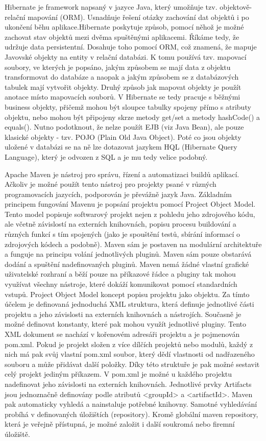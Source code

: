 Hibernate je framework napsaný v jazyce Java, který umožňuje tzv. objektově-relační mapování (ORM). Usnadňuje řešení otázky zachování dat objektů i po ukončení běhu aplikace.Hibernate poskytuje způsob, pomocí něhož je možné zachovat stav objektů mezi dvěma spuštěnými aplikacemi. Říkáme tedy, že udržuje data persistentní. Dosahuje toho pomocí ORM, což znamená, že mapuje Javovské objekty na entity v relační databázi. K tomu používá tzv. mapovací soubory, ve kterých je popsáno, jakým způsobem se mají data z objektu transformovat do databáze a naopak a jakým způsobem se z databázových tabulek mají vytvořit objekty. Druhý způsob jak mapovat objekty je použít anotace místo mapovacích souborů. V Hibernate se tedy pracuje s běžnými business objekty, přičemž mohou být sloupce tabulky spojeny přímo s atributy objektu, nebo mohou být připojeny skrze metody get/set a metody hashCode() a equals(). Nutno podotknout, že nelze použít EJB (viz Java Bean), ale pouze klasické objekty - tzv. POJO (Plain Old Java Object). Poté co jsou objekty uložené v databázi se na ně lze dotazovat jazykem HQL (Hibernate Query Language), který je odvozen z SQL a je mu tedy velice podobný.

Apache Maven je nástroj pro správu, řízení a automatizaci buildů aplikací. Ačkoliv je možné použít tento nástroj pro projekty psané v různých programovacích jazycích, podporován je převážně jazyk Java. Základním principem fungování Mavenu je popsání projektu pomocí Project Object Model. Tento model popisuje softwarový projekt nejen z pohledu jeho zdrojového kódu, ale včetně závislostí na externích knihovnách, popisu procesu buildování a různých funkcí s tím spojených (jako je spouštění testů, sbírání informací o zdrojových kódech a podobně). Maven sám je postaven na modulární architektuře a funguje na principu volání jednotlivých pluginů. Maven sám pouze obstarává dodání a spuštění nadefinovaných pluginů. Maven nemá žádné vlastní grafické uživatelské rozhraní a běží pouze na příkazové řádce a pluginy tak mohou využívat všechny nástroje, které dokáží komunikovat pomocí standardních vstupů. Project Object Model koncept popisu projektu jako objektu. Za tímto účelem je definovaná jednoduchá XML struktura, která definuje jednotlivé části projektu a jeho závislosti na externích knihovnách a nástrojích. Současně je možné definovat konstanty, které pak mohou využít jednotlivé pluginy. Tento XML dokument se nachází v kořenovém adresáři projektu a je pojmenován pom.xml. Pokud je projekt složen z více dílčích projektů nebo modulů, každý z nich má pak svůj vlastní pom.xml soubor, který dědí vlastnosti od nadřazeného souboru a může přidávat další položky. Díky této struktuře je pak možné sestavit celý projekt jediným příkazem. V pom.xml je možné u každého projektu nadefinovat jeho závislosti na externích knihovnách. Jednotlivé prvky Artifacts jsou jednoznačně definovány podle atributů <groupId> a <artifactId>. Maven pak automaticky vyhledá a nainstaluje potřebné knihovny. Samotné vyhledávání probíhá v definovaných úložištích (repository). Kromě globální maven repository, která je veřejně přístupná, je možné založit i další soukromá nebo firemní úložiště.

